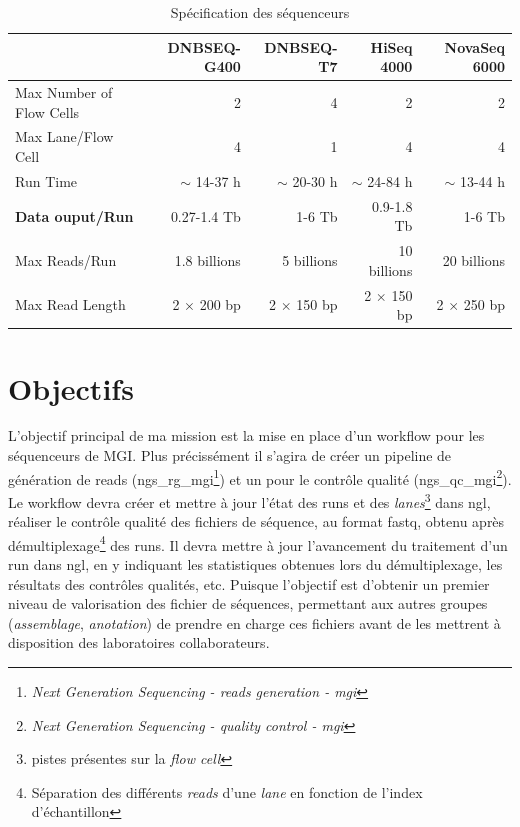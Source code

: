 \begin{table}[H]
\begin{tabular}{ |p{5cm}||r|r|r|r| }
    \hline
    & \footnotesize{DNBSEQ-G400} & \footnotesize{DNBSEQ-T7} & \footnotesize{HiSeq 4000} & \footnotesize{NovaSeq 6000} \\\hline\hline
    Max Number of Flow Cells & 2 & 4 & 2 & 2 \\\hline
    Max Lane/Flow Cell & 4 & 1 & 4 & 4 \\\hline
    Run Time & $\sim$ 14-37 h & $\sim$ 20-30 h & $\sim$ 24-84 h & $\sim$ 13-44 h \\\hline
    \textbf{Data ouput/Run} & 0.27-1.4 Tb & 1-6 Tb & 0.9-1.8 Tb & 1-6 Tb \\\hline
    Max Reads/Run & 1.8 billions & 5 billions & 10 billions & 20 billions \\\hline
    Max Read Length & 2 $\times$ 200 bp & 2 $\times$ 150 bp & 2 $\times$ 150 bp & 2 $\times$ 250 bp \\\hline
\end{tabular}
    \caption{Spécification des séquenceurs}
    \label{spe-seq}
\end{table}

\section{Objectifs}
L'objectif principal de ma mission est la mise en place d'un workflow pour les séquenceurs de MGI. Plus précissément il s'agira de créer un pipeline de génération de reads (ngs\_rg\_mgi\footnote{\emph{Next Generation Sequencing - reads generation - mgi}}) et un pour le contrôle qualité (ngs\_qc\_mgi\footnote{\emph{Next Generation Sequencing - quality control - mgi}}). Le workflow devra créer et mettre à jour l'état des runs et des \emph{lanes}\footnote{pistes présentes sur la \emph{flow cell}} dans ngl, réaliser le contrôle qualité des fichiers de séquence, au format fastq, obtenu après démultiplexage\footnote{Séparation des différents \emph{reads} d'une \emph{lane} en fonction de l'index d'échantillon} des runs. Il devra mettre à jour l'avancement du traitement d'un run dans ngl, en y indiquant les statistiques obtenues lors du démultiplexage, les résultats des contrôles qualités, etc. Puisque l'objectif est d'obtenir un premier niveau de valorisation des fichier de séquences, permettant aux autres groupes (\emph{assemblage}, \emph{anotation}) de prendre en charge ces fichiers avant de les mettrent à disposition des laboratoires collaborateurs.\\

